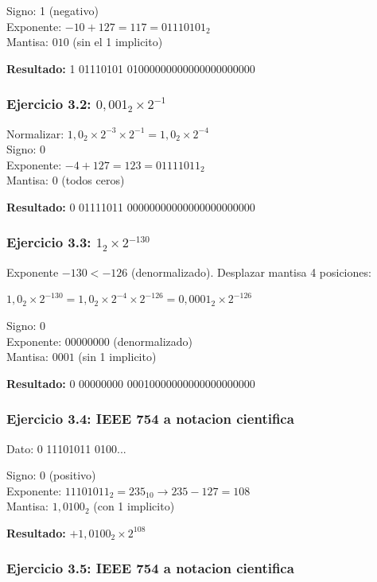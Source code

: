 \documentclass[12pt,a4paper]{article}
\begin{document}
Signo: 1 (negativo)\\
Exponente: $-10 + 127 = 117 = 01110101_2$\\
Mantisa: $010$ (sin el 1 implicito)

\textbf{Resultado:} 1 01110101 01000000000000000000000

\subsubsection{Ejercicio 3.2: $0,001_2 \times 2^{-1}$}

Normalizar: $1,0_2 \times 2^{-3} \times 2^{-1} = 1,0_2 \times 2^{-4}$\\
Signo: 0\\
Exponente: $-4 + 127 = 123 = 01111011_2$\\
Mantisa: 0 (todos ceros)

\textbf{Resultado:} 0 01111011 00000000000000000000000

\subsubsection{Ejercicio 3.3: $1_2 \times 2^{-130}$}

Exponente $-130 < -126$ (denormalizado). Desplazar mantisa 4 posiciones:

$1,0_2 \times 2^{-130} = 1,0_2 \times 2^{-4} \times 2^{-126} = 0,0001_2 \times 2^{-126}$

Signo: 0\\
Exponente: 00000000 (denormalizado)\\
Mantisa: $0001$ (sin 1 implicito)

\textbf{Resultado:} 0 00000000 00010000000000000000000

\subsubsection{Ejercicio 3.4: IEEE 754 a notacion cientifica}

Dato: 0 11101011 0100...

Signo: 0 (positivo)\\
Exponente: $11101011_2 = 235_{10} \rightarrow 235 - 127 = 108$\\
Mantisa: $1,0100_2$ (con 1 implicito)

\textbf{Resultado:} $+1,0100_2 \times 2^{108}$

\subsubsection{Ejercicio 3.5: IEEE 754 a notacion cientifica}
\end{document}
